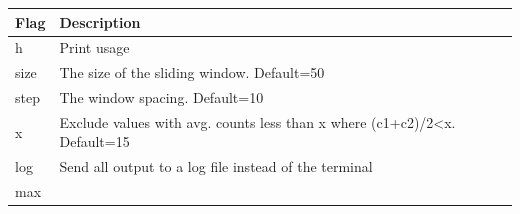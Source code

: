 \documentclass[11pt,]{article}
\begin{document}
\begin{longtable}[]{@{}ll@{}}
\toprule
\begin{minipage}[b]{0.06\columnwidth}\raggedright\strut
Flag\strut
\end{minipage} & \begin{minipage}[b]{0.88\columnwidth}\raggedright\strut
Description\strut
\end{minipage}\tabularnewline
\midrule
\endhead
\begin{minipage}[t]{0.06\columnwidth}\raggedright\strut
h\strut
\end{minipage} & \begin{minipage}[t]{0.88\columnwidth}\raggedright\strut
Print usage\strut
\end{minipage}\tabularnewline
\begin{minipage}[t]{0.06\columnwidth}\raggedright\strut
size\strut
\end{minipage} & \begin{minipage}[t]{0.88\columnwidth}\raggedright\strut
The size of the sliding window. Default=50\strut
\end{minipage}\tabularnewline
\begin{minipage}[t]{0.06\columnwidth}\raggedright\strut
step\strut
\end{minipage} & \begin{minipage}[t]{0.88\columnwidth}\raggedright\strut
The window spacing. Default=10\strut
\end{minipage}\tabularnewline
\begin{minipage}[t]{0.06\columnwidth}\raggedright\strut
x\strut
\end{minipage} & \begin{minipage}[t]{0.88\columnwidth}\raggedright\strut
Exclude values with avg. counts less than x where (c1+c2)/2\textless{}x.
Default=15\strut
\end{minipage}\tabularnewline
\begin{minipage}[t]{0.06\columnwidth}\raggedright\strut
log\strut
\end{minipage} & \begin{minipage}[t]{0.88\columnwidth}\raggedright\strut
Send all output to a log file instead of the terminal\strut
\end{minipage}\tabularnewline
\begin{minipage}[t]{0.06\columnwidth}\raggedright\strut
max\strut
\end{minipage} & \begin{minipage}[t]{0.88\columnwidth}\raggedright\strut

\end{minipage}
\end{longtable}
\end{document}
